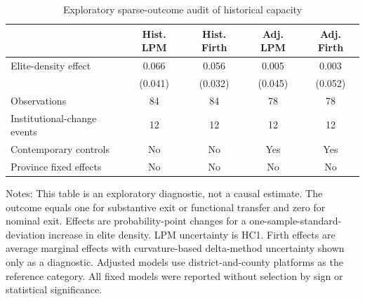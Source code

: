 \begin{table}[htbp]
\centering
\caption{Exploratory sparse-outcome audit of historical capacity}
\label{tab:exploratory-sparse-outcome-audit}
\small
\setlength{\tabcolsep}{4pt}
\begin{tabular}{@{}lcccc@{}}
\toprule
 & Hist. LPM & Hist. Firth & Adj. LPM & Adj. Firth \\
\midrule
Elite-density effect & 0.066 & 0.056 & 0.005 & 0.003 \\
 & (0.041) & (0.032) & (0.045) & (0.052) \\
\midrule
Observations & 84 & 84 & 78 & 78 \\
Institutional-change events & 12 & 12 & 12 & 12 \\
Contemporary controls & No & No & Yes & Yes \\
Province fixed effects & No & No & No & No \\
\bottomrule
\end{tabular}
\begin{minipage}{0.94\linewidth}
\vspace{0.5em}\footnotesize Notes: This table is an exploratory diagnostic, not
a causal estimate. The outcome equals one for substantive exit or functional
transfer and zero for nominal exit. Effects are probability-point changes for
a one-sample-standard-deviation increase in elite density. LPM uncertainty is
HC1. Firth effects are average marginal effects with curvature-based
delta-method uncertainty shown only as a diagnostic. Adjusted models use
district-and-county platforms as the reference category. All fixed models were
reported without selection by sign or statistical significance.
\end{minipage}
\end{table}

